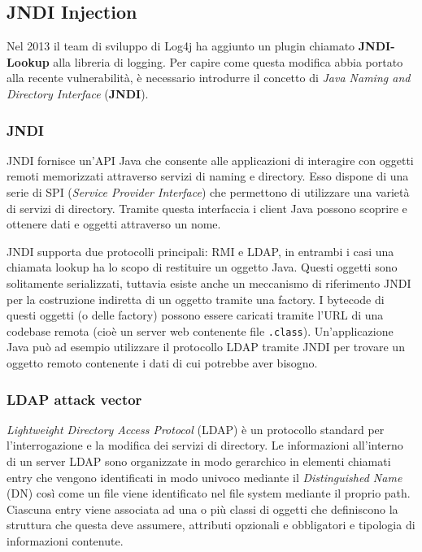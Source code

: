 \documentclass[a4paper, 12pt]{article}
\begin{document}
\subsection{JNDI Injection}

Nel 2013 il team di sviluppo di Log4j ha aggiunto un plugin chiamato \textbf{JNDI-Lookup} alla libreria di logging. Per capire come questa modifica abbia portato alla recente vulnerabilità, è necessario introdurre il concetto di \emph{Java Naming and Directory Interface} (\textbf{JNDI}).

\subsubsection{JNDI}

JNDI fornisce un'API Java che consente alle applicazioni di interagire con oggetti remoti memorizzati attraverso servizi di naming e directory.
Esso dispone di una serie di SPI (\emph{Service Provider Interface}) che permettono di utilizzare una varietà di servizi di directory.
Tramite questa interfaccia i client Java possono scoprire e ottenere dati e oggetti attraverso un nome. 

JNDI supporta due protocolli principali: RMI e LDAP, in entrambi i casi una chiamata lookup ha lo scopo di restituire un oggetto Java. Questi oggetti sono solitamente serializzati, tuttavia esiste anche un meccanismo di riferimento JNDI per la costruzione indiretta di un oggetto tramite una factory.
I bytecode di questi oggetti (o delle factory) possono essere caricati tramite l'URL di una codebase remota (cioè un server web contenente file \verb!.class!). Un'applicazione Java può ad esempio utilizzare il protocollo LDAP tramite JNDI per trovare un oggetto remoto contenente i dati di cui potrebbe aver bisogno.

\subsubsection{LDAP attack vector}
\emph{Lightweight Directory Access Protocol} (LDAP) è un protocollo standard per l'interrogazione e la modifica dei servizi di directory.
Le informazioni all’interno di un server LDAP sono organizzate in modo gerarchico in elementi chiamati entry che vengono identificati in modo univoco mediante il \emph{Distinguished Name} (DN) così come un file viene identificato nel file system mediante il proprio path. Ciascuna entry viene associata ad una o più classi di oggetti che definiscono la struttura che questa deve assumere, attributi opzionali e obbligatori e tipologia di informazioni contenute.
\end{document}
